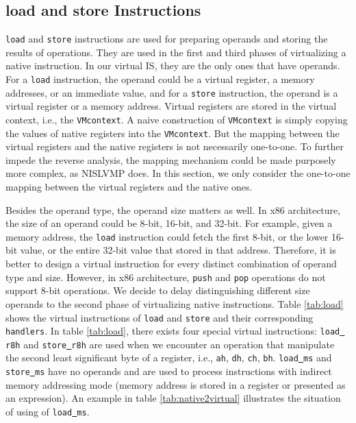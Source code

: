 \subsection{load and store Instructions}
\texttt{load} and \texttt{store} instructions are used for preparing operands and storing the results of operations. They are used in the first and third phases of virtualizing a native instruction. In our virtual IS, they are the only ones that have operands. For a \texttt{load} instruction, the operand could be a virtual register, a memory addresses, or an immediate value, and for a \texttt{store} instruction, the operand is a virtual register or a memory address. Virtual registers are stored in the virtual context, i.e., the \texttt{VMcontext}. A naive construction of \texttt{VMcontext} is simply copying the values of native registers into the \texttt{VMcontext}. But the mapping between the virtual registers and the native registers is not necessarily one-to-one. To further impede the reverse analysis, the mapping mechanism could be made purposely more complex, as NISLVMP \cite{wang2013nislvmp} does. In this section, we only consider the one-to-one mapping between the virtual registers and the native ones.



Besides the operand type, the operand size matters as well. In x86 architecture, the size of an operand could be 8-bit, 16-bit, and 32-bit. For example, given a memory address, the \texttt{load} instruction could fetch the first 8-bit, or the lower 16-bit value, or the entire 32-bit value that stored in that address. Therefore, it is better to design a virtual instruction for every distinct combination of operand type and size. However, in x86 architecture, \texttt{push} and \texttt{pop} operations do not support 8-bit operations. We decide to delay distinguishing different size operands to the second phase of virtualizing native instructions. Table \ref{tab:load} shows the virtual instructions of \texttt{load} and \texttt{store} and their corresponding \texttt{handlers}. In table \ref{tab:load}, there exists four special virtual instructions: \texttt{load\underline{ }r8h} and \texttt{store\underline{ }r8h} are used when we encounter an operation that manipulate the second least significant byte of a register, i.e., \texttt{ah}, \texttt{dh}, \texttt{ch}, \texttt{bh}. \texttt{load\underline{ }ms} and \texttt{store\underline{ }ms} have no operands and are used to process instructions with indirect memory addressing mode (memory address is stored in a register or presented as an expression). An example in table \ref{tab:native2virtual} illustrates the situation of using of \texttt{load\underline{ }ms}.

